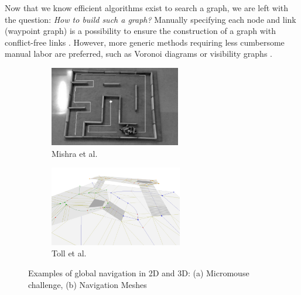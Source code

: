 Now that we know efficient algorithms exist to search a graph, we are left with the question: \textit{How to build such a graph?}
Manually specifying each node and link (waypoint graph) is a possibility to ensure the construction of a graph with conflict-free links \cite{waypoints_graph_lars_2002}.%
However, more generic methods requiring less cumbersome manual labor are preferred, such as Voronoi diagrams \cite{voronoi_example_2007} or visibility graphs \cite{visiblity_graph_example_2004}. \\

\begin{figure}[h]
    \centering
    \captionsetup[subfigure]{justification=centering}
    \begin{subfigure}[t]{0.4\linewidth}
    \includegraphics[width=\textwidth,height=3.5cm]{Figures/Chapter_SOTA//micromouse_maze.png}
    \caption{Mishra et al. \cite{micromouse_mishra_2008}}
    \label{fig:global_nav_0}
    \end{subfigure}
    \begin{subfigure}[t]{0.4\linewidth}
    \includegraphics[width=\textwidth,height=3.5cm]{Figures/Chapter_SOTA//navMesh.png}
    \caption{Toll et al. \cite{toll_2011_navMesh}}
    \label{fig:global_nav_1}
    \end{subfigure}
    \caption{Examples of global navigation in 2D and 3D: (a) Micromouse challenge, (b) Navigation Meshes} %
    \label{fig:global_nav}
\end{figure}

